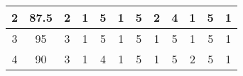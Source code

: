 \documentclass[12pt,a4paper]{report}
\begin{document}
\begin{sidewaystable}
\begin{tabular}{|c|c|c|c|c|c|c|c|c|c|c|c|}
2                                                               & {\color[HTML]{EA4335} 87.5}                                                          & 2                                                            & 1                                                            & 5                                                            & 1                                                            & 5                                                            & 2                                                            & 4                                                            & 1                                                            & 5                                                            & 1                                                             \\ \hline
3                                                               & {\color[HTML]{EA4335} 95}                                                            & 3                                                            & 1                                                            & 5                                                            & 1                                                            & 5                                                            & 1                                                            & 5                                                            & 1                                                            & 5                                                            & 1                                                             \\ \hline
4                                                               & {\color[HTML]{EA4335} 90}                                                            & 3                                                            & 1                                                            & 4                                                            & 1                                                            & 5                                                            & 1                                                            & 5                                                            & 2                                                            & 5                                                            & 1                                                             \\ \hline

\end{tabular}
\end{sidewaystable}
\end{document}
